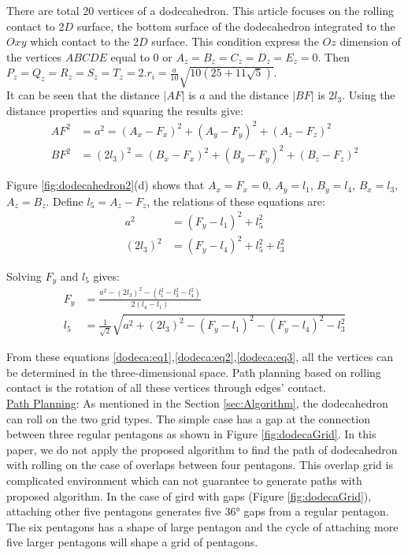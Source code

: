 \noindent There are total $20$ vertices of a dodecahedron. 
This article focuses on the rolling contact to $2D$ surface, the bottom surface of the dodecahedron integrated to the $Oxy$ which contact to the $2D$ surface. 
This condition express the $Oz$ dimension of the vertices $ABCDE$ equal to $0$ or $A_z = B_z = C_z = D_z = E_z = 0$. 
Then $P_z = Q_z = R_z = S_z = T_z = 2.r_i = \frac{a}{10}\sqrt{10(25+11\sqrt{5})}$.\\

\noindent It can be seen that the distance $|AF|$ is $a$ and the distance $|BF|$ is $2l_3$. Using the distance properties and squaring the results give:
\begin{equation} 
\label{dodeca:eq1}
\begin{split}
AF^2 & = a^2 = (A_x-F_x)^2 + (A_y-F_y)^2 + (A_z-F_z)^2 \\
BF^2 & = (2l_3)^2 = (B_x-F_x)^2 + (B_y-F_y)^2 + (B_z-F_z)^2
\end{split}
\end{equation}

\noindent Figure \ref{fig:dodecahedron2}(d) shows that $A_x = F_x = 0$, $A_y = l_1$, $B_y = l_4$, $B_x = l_3$, $A_z = B_z$. Define $l_5=A_z-F_z$, the relations of these equations are:
\begin{equation} 
\label{dodeca:eq2}
\begin{split}
a^2 & = (F_y-l_1)^2 + l_5^2\\
(2l_3)^2 & = (F_y-l_4)^2 + l_5^2 + l_3^2
\end{split}
\end{equation}

\noindent Solving $F_y$ and $l_5$ gives:
\begin{equation} 
\label{dodeca:eq3}
\begin{split}
F_y & = \frac{a^2-(2l_3)^2-(l_1^2-l_3^2-l_4^2)}{2(l_4-l_1)} \\
l_5 & = \frac{1}{\sqrt{2}}\sqrt{a^2+(2l_3)^2-(F_y-l_1)^2-(F_y-l_4)^2-l_3^2}
\end{split}
\end{equation}

\noindent From these equations \ref{dodeca:eq1},\ref{dodeca:eq2},\ref{dodeca:eq3}, all the vertices can be determined in the three-dimensional space. 
Path planning based on rolling contact is the rotation of all these vertices through edges' contact.\\

\noindent\uline{Path Planning}: As mentioned in the Section \ref{sec:Algorithm}, the dodecahedron can roll on the two grid types. 
The simple case has a gap at the connection between three regular pentagons as shown in Figure \ref{fig:dodecaGrid}. 
In this paper, we do not apply the proposed algorithm to find the path of dodecahedron with rolling on the case of overlaps between four pentagons. 
This overlap grid is complicated environment which can not guarantee to generate paths with proposed algorithm. 
In the case of gird with gaps (Figure \ref{fig:dodecaGrid}), attaching other five pentagons generates five $\ang{36}$ gaps from a regular pentagon. 
The six pentagons has a shape of large pentagon and the cycle of attaching more five larger pentagons will shape a grid of pentagons.\\

